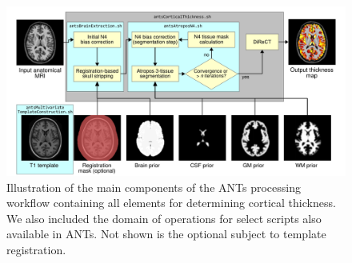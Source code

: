 %
%



\begin{figure}
  \centering
  \includegraphics[width=180mm]{Figures/Kapowski_pipeline2.pdf}
  \caption{Illustration of the main components of the ANTs processing 
  workflow containing all elements for determining cortical thickness. 
  We also included the domain of operations for select scripts also available
  in ANTs.
  Not shown is the optional subject to template registration.}
  \label{fig:pipeline}
\end{figure}

